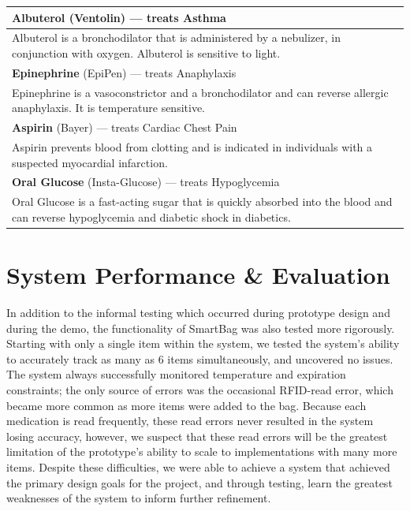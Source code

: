 \documentclass{sigchi}
\begin{document}
\begin{center}
\label{tab:meds} 
\begin{tabular}{|m{22em}|}
 \hline

 \textbf{Albuterol} (Ventolin) --- treats Asthma\\
 \hline
 Albuterol is a bronchodilator that is administered by a nebulizer, in conjunction
 with oxygen. Albuterol is sensitive to light.\\
 \hline\hline
 
 \textbf{Epinephrine} (EpiPen) --- treats Anaphylaxis\\
 \hline
 Epinephrine is a vasoconstrictor and a bronchodilator and can reverse allergic
 anaphylaxis. It is temperature sensitive.\\
 \hline\hline
 
 \textbf{Aspirin} (Bayer) --- treats Cardiac Chest Pain\\
 \hline
 Aspirin prevents blood from clotting and is indicated in individuals with a
 suspected myocardial infarction.\\
 \hline\hline
 
 \textbf{Oral Glucose} (Insta-Glucose) --- treats Hypoglycemia\\
 \hline
 Oral Glucose is a fast-acting sugar that is quickly absorbed into the blood and
 can reverse hypoglycemia and diabetic shock in diabetics.\\
 \hline
\end{tabular}
\end{center}


\section{System Performance \& Evaluation} \label{eval}
In addition to the informal testing which occurred during prototype design and
during the demo, the functionality of SmartBag was also tested more rigorously.
Starting with only a single item within the system, we tested the system's
ability to accurately track as many as 6 items simultaneously, and uncovered no
issues. The system always successfully monitored temperature and expiration
constraints; the only source of errors was the occasional RFID-read error, which
became more common as more items were added to the bag. Because each medication
is read frequently, these read errors never resulted in the system losing accuracy,
however, we suspect that these read errors will be the greatest limitation of the
prototype's ability to scale to implementations with many more items. Despite these
difficulties, we were able to achieve a system that achieved the primary design goals
for the project, and through testing, learn the greatest weaknesses of the system
to inform further refinement.
\end{document}
